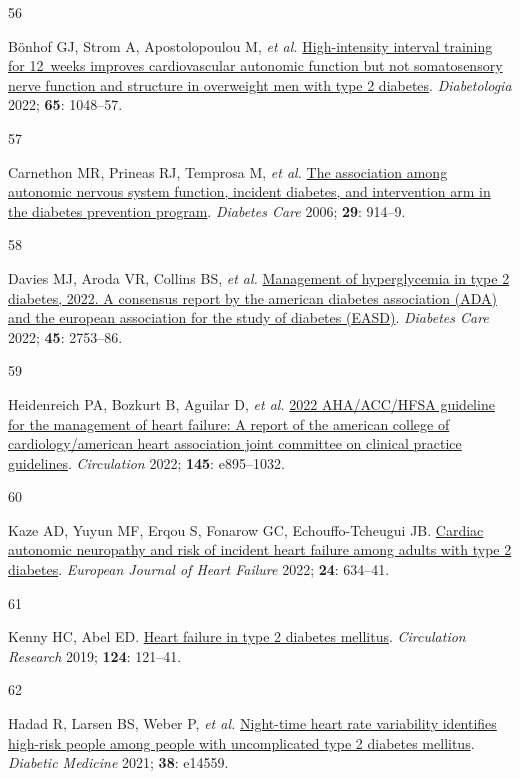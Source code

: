 \documentclass[
  a4paper,
  headsepline=true,
  open=any]{scrbook}
\newlength{\cslhangindent}
\newlength{\csllabelwidth}
\newlength{\cslentryspacingunit} %
\newenvironment{CSLReferences}[2] %
 {%
  \setlength{\parindent}{0pt}
  \ifodd #1
  \let\oldpar\par
  \def\par{\hangindent=\cslhangindent\oldpar}
  \fi
  \setlength{\parskip}{#2\cslentryspacingunit}
 }%
 {}
\newcommand{\CSLLeftMargin}[1]{\parbox[t]{\csllabelwidth}{#1}}
\newcommand{\CSLRightInline}[1]{\parbox[t]{\linewidth - \csllabelwidth}{#1}\break}
\begin{document}
\begin{CSLReferences}{0}{0}
\leavevmode{}%
\CSLLeftMargin{56 }%
\CSLRightInline{Bönhof GJ, Strom A, Apostolopoulou M, \emph{et al.}
\href{https://doi.org/10.1007/s00125-022-05674-w}{High-intensity
interval training for 12~weeks improves cardiovascular autonomic
function but not somatosensory nerve function and structure in
overweight men with type 2 diabetes}. \emph{Diabetologia} 2022;
\textbf{65}: 1048--57.}

\leavevmode{}%
\CSLLeftMargin{57 }%
\CSLRightInline{Carnethon MR, Prineas RJ, Temprosa M, \emph{et al.}
\href{https://doi.org/10.2337/diacare.29.04.06.dc05-1729}{The
association among autonomic nervous system function, incident diabetes,
and intervention arm in the diabetes prevention program}. \emph{Diabetes
Care} 2006; \textbf{29}: 914--9.}

\leavevmode{}%
\CSLLeftMargin{58 }%
\CSLRightInline{Davies MJ, Aroda VR, Collins BS, \emph{et al.}
\href{https://doi.org/10.2337/dci22-0034}{Management of hyperglycemia in
type 2 diabetes, 2022. A consensus report by the american diabetes
association (ADA) and the european association for the study of diabetes
(EASD)}. \emph{Diabetes Care} 2022; \textbf{45}: 2753--86.}

\leavevmode{}%
\CSLLeftMargin{59 }%
\CSLRightInline{Heidenreich PA, Bozkurt B, Aguilar D, \emph{et al.}
\href{https://doi.org/10.1161/CIR.0000000000001063}{2022 AHA/ACC/HFSA
guideline for the management of heart failure: A report of the american
college of cardiology/american heart association joint committee on
clinical practice guidelines}. \emph{Circulation} 2022; \textbf{145}:
e895--1032.}

\leavevmode{}%
\CSLLeftMargin{60 }%
\CSLRightInline{Kaze AD, Yuyun MF, Erqou S, Fonarow GC,
Echouffo-Tcheugui JB. \href{https://doi.org/10.1002/ejhf.2432}{Cardiac
autonomic neuropathy and risk of incident heart failure among adults
with type 2 diabetes}. \emph{European Journal of Heart Failure} 2022;
\textbf{24}: 634--41.}

\leavevmode{}%
\CSLLeftMargin{61 }%
\CSLRightInline{Kenny HC, Abel ED.
\href{https://doi.org/10.1161/CIRCRESAHA.118.311371}{Heart failure in
type 2 diabetes mellitus}. \emph{Circulation Research} 2019;
\textbf{124}: 121--41.}

\leavevmode{}%
\CSLLeftMargin{62 }%
\CSLRightInline{Hadad R, Larsen BS, Weber P, \emph{et al.}
\href{https://doi.org/10.1111/dme.14559}{Night-time heart rate
variability identifies high-risk people among people with uncomplicated
type 2 diabetes mellitus}. \emph{Diabetic Medicine} 2021; \textbf{38}:
e14559.}


\end{CSLReferences}
\end{document}
